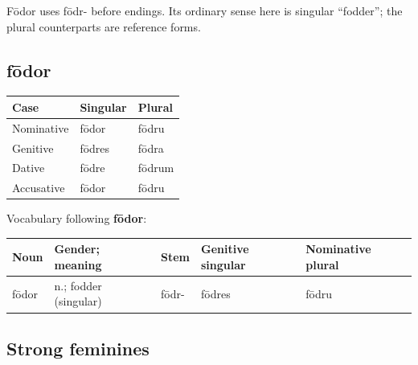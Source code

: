 Fōdor uses fōdr- before endings. Its ordinary sense here is singular “fodder”; the plural counterparts are reference forms.

\subsection*{fōdor}

\par\begingroup
\fontsize{10.5}{13.2}\selectfont
\setlength{\LTleft}{0pt}\setlength{\LTright}{\fill}
\noindent
\begin{tabular}{@{}>{\raggedright\arraybackslash}p{39.46mm}>{\raggedright\arraybackslash}p{39.46mm}>{\raggedright\arraybackslash}p{39.46mm}@{}}
\toprule
\textbf{Case} & \textbf{Singular} & \textbf{Plural} \\
\midrule
Nominative & fōdor & fōdru \\
Genitive & fōdres & fōdra \\
Dative & fōdre & fōdrum \\
Accusative & fōdor & fōdru \\
\bottomrule
\end{tabular}
\par\endgroup

Vocabulary following \textbf{fōdor}:

\par\begingroup
\fontsize{10.5}{13.2}\selectfont
\setlength{\LTleft}{0pt}\setlength{\LTright}{\fill}
\noindent
\begin{tabular}{@{}>{\raggedright\arraybackslash}p{18.75mm}>{\raggedright\arraybackslash}p{28.02mm}>{\raggedright\arraybackslash}p{18.75mm}>{\raggedright\arraybackslash}p{22.59mm}>{\raggedright\arraybackslash}p{24.65mm}@{}}
\toprule
\textbf{Noun} & \textbf{Gender; meaning} & \textbf{Stem} & \textbf{Genitive singular} & \textbf{Nominative plural} \\
\midrule
fōdor & n.; fodder (singular) & fōdr- & fōdres & fōdru \\
\bottomrule
\end{tabular}
\par\endgroup

\subsection*{Strong feminines}


